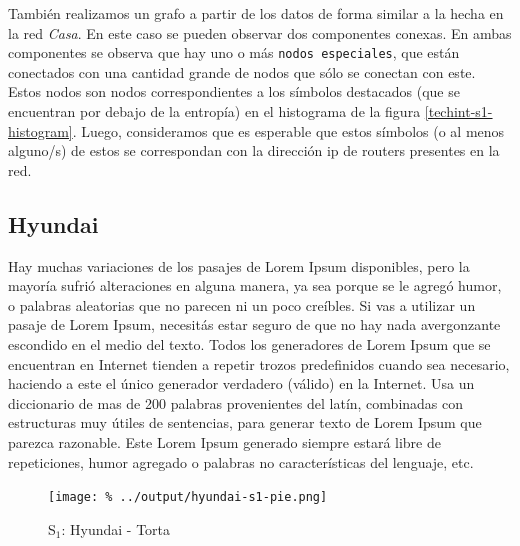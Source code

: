 \documentclass[final,inline,a4paper,narroweqnarray]{ieee}
\begin{document}
  También realizamos un grafo a partir de los datos de forma similar a la
  hecha en la red \emph{Casa}. En este caso se pueden observar dos componentes
  conexas. En ambas componentes se observa que hay uno o más \texttt{nodos
  especiales}, que están conectados con una cantidad grande de nodos que
  sólo se conectan con este. Estos nodos son nodos correspondientes a
  los símbolos destacados (que se encuentran por debajo de la entropía) en
  el histograma de la figura \ref{techint-s1-histogram}. Luego, consideramos
  que es esperable que estos símbolos (o al menos alguno/s) de estos se
  correspondan con la dirección ip de routers presentes en la red.

  \subsection{Hyundai}

Hay muchas variaciones de los pasajes de Lorem Ipsum disponibles, pero la mayoría sufrió alteraciones en alguna manera, ya sea porque se le agregó humor, o palabras aleatorias que no parecen ni un poco creíbles. Si vas a utilizar un pasaje de Lorem Ipsum, necesitás estar seguro de que no hay nada avergonzante escondido en el medio del texto. Todos los generadores de Lorem Ipsum que se encuentran en Internet tienden a repetir trozos predefinidos cuando sea necesario, haciendo a este el único generador verdadero (válido) en la Internet. Usa un diccionario de mas de 200 palabras provenientes del latín, combinadas con estructuras muy útiles de sentencias, para generar texto de Lorem Ipsum que parezca razonable. Este Lorem Ipsum generado siempre estará libre de repeticiones, humor agregado o palabras no características del lenguaje, etc.

    \begin{figure}[H]\begin{center}
      \texttt{[image: \%
      ../output/hyundai-s1-pie.png]}
      \vspace{-2em}
      \caption{S$_1$: Hyundai - Torta}
      \label{hyundai-s1-pie}
    \end{center}\end{figure}
\end{document}
